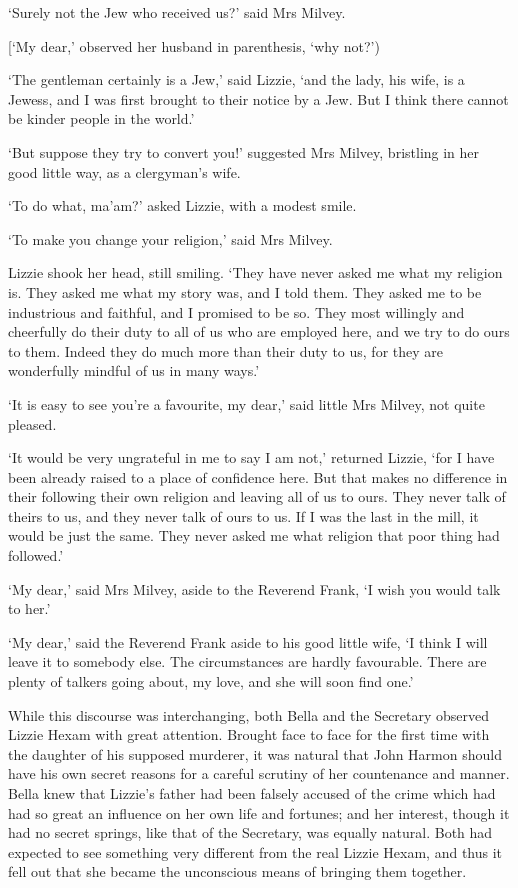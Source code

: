 ‘Surely not the Jew who received us?’ said Mrs Milvey.

[‘My dear,’ observed her husband in parenthesis, ‘why not?’)

‘The gentleman certainly is a Jew,’ said Lizzie, ‘and the lady, his
wife, is a Jewess, and I was first brought to their notice by a Jew. But
I think there cannot be kinder people in the world.’

‘But suppose they try to convert you!’ suggested Mrs Milvey, bristling
in her good little way, as a clergyman’s wife.

‘To do what, ma’am?’ asked Lizzie, with a modest smile.

‘To make you change your religion,’ said Mrs Milvey.

Lizzie shook her head, still smiling. ‘They have never asked me what
my religion is. They asked me what my story was, and I told them. They
asked me to be industrious and faithful, and I promised to be so.
They most willingly and cheerfully do their duty to all of us who are
employed here, and we try to do ours to them. Indeed they do much more
than their duty to us, for they are wonderfully mindful of us in many
ways.’

‘It is easy to see you’re a favourite, my dear,’ said little Mrs Milvey,
not quite pleased.

‘It would be very ungrateful in me to say I am not,’ returned Lizzie,
‘for I have been already raised to a place of confidence here. But that
makes no difference in their following their own religion and leaving
all of us to ours. They never talk of theirs to us, and they never talk
of ours to us. If I was the last in the mill, it would be just the same.
They never asked me what religion that poor thing had followed.’

‘My dear,’ said Mrs Milvey, aside to the Reverend Frank, ‘I wish you
would talk to her.’

‘My dear,’ said the Reverend Frank aside to his good little wife, ‘I
think I will leave it to somebody else. The circumstances are hardly
favourable. There are plenty of talkers going about, my love, and she
will soon find one.’

While this discourse was interchanging, both Bella and the Secretary
observed Lizzie Hexam with great attention. Brought face to face for the
first time with the daughter of his supposed murderer, it was natural
that John Harmon should have his own secret reasons for a careful
scrutiny of her countenance and manner. Bella knew that Lizzie’s
father had been falsely accused of the crime which had had so great an
influence on her own life and fortunes; and her interest, though it had
no secret springs, like that of the Secretary, was equally natural. Both
had expected to see something very different from the real Lizzie Hexam,
and thus it fell out that she became the unconscious means of bringing
them together.

